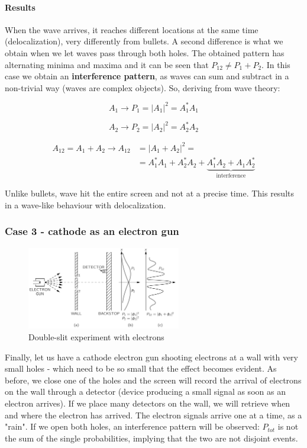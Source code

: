        \paragraph{Results}
        When the wave arrives, it reaches different locations at the same time (delocalization), very differently from bullets.
        A second difference is what we obtain when we let waves pass through both holes.
        The obtained pattern has alternating minima and maxima and it can be seen that $P_{12} \neq P_1+P_2$.
        In this case we obtain an \textbf{interference pattern}, as waves can sum and subtract in a non-trivial way (waves are complex objects).
        So, deriving from wave theory:

        $$A_1\rightarrow P_1 = |A_1|^2 = A_1^*A_1$$

        $$A_2\rightarrow P_2 = |A_2|^2 = A_2^*A_2$$

        \begin{align*}
          A_{12} = A_1+A_2\rightarrow A_{12} &= |A_1+A_2|^2=\\
                                            &=A_1^*A_1 + A_2^*A_2 + \underbrace{A_1^*A_2 + A_1A_2^*}_{\text{interference}}
        \end{align*}

        Unlike bullets, wave hit the entire screen and not at a precise time.
        This results in a wave-like behaviour with delocalization.

    \subsubsection{Case 3 - cathode as an electron gun}

    \begin{figure}[h!]
      \centering
      \includegraphics[clip, width=0.6\textwidth]{electron_ds.png}
      \caption{\label{fig:electron_ds} Double-slit experiment with electrons}
    \end{figure}

    Finally, let us have a cathode electron gun shooting electrons at a wall with very small holes - which need to be so small that the effect becomes evident.
    As before, we close one of the holes and the screen will record the arrival of electrons on the wall through a detector (device producing a small signal as soon as an electron arrives).
    If we place many detectors on the wall, we will retrieve when and where the electron has arrived.
    The electron signals arrive one at a time, as a "rain".
    If we open both holes, an interference pattern will be observed: $P_{tot}$ is not the sum of the single probabilities, implying that the two are not disjoint events.

